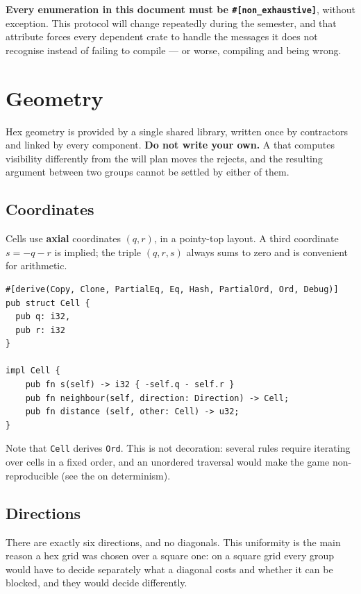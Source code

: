 \documentclass{article}
\begin{document}
\textbf{Every enumeration in this document must be \texttt{\#[non\_exhaustive]}}, without
exception. This protocol will change repeatedly during
the semester, and that attribute forces every dependent crate to handle the messages it does not
recognise instead of failing to compile --- or worse, compiling and being wrong.

\newpage
\section{Geometry}
\label{proto:geometry}

Hex geometry is provided by a single shared library, written once by contractors and linked by
every component. \textbf{Do not write your own.} A \ship{} that computes visibility differently
from the \chart{} will plan moves the \chart{} rejects, and the resulting argument between two
groups cannot be settled by either of them.

\subsection{Coordinates}
\label{proto:coords}

Cells use \textbf{axial} coordinates $(q, r)$, in a pointy-top layout. A third coordinate
$s = -q - r$ is implied; the triple $(q, r, s)$ always sums to zero and is convenient for
arithmetic.

\begin{lstlisting}
#[derive(Copy, Clone, PartialEq, Eq, Hash, PartialOrd, Ord, Debug)]
pub struct Cell {
  pub q: i32,
  pub r: i32
}

impl Cell {
    pub fn s(self) -> i32 { -self.q - self.r }
    pub fn neighbour(self, direction: Direction) -> Cell;
    pub fn distance (self, other: Cell) -> u32;
}
\end{lstlisting}

Note that \texttt{Cell} derives \texttt{Ord}. This is not decoration: several rules require
iterating over cells in a fixed order, and an unordered traversal would make the game
non-reproducible (see the \MD{} on determinism).

\subsection{Directions}
\label{proto:directions}

There are exactly six directions, and no diagonals. This uniformity is the main reason a hex grid
was chosen over a square one: on a square grid every group would have to decide separately what a
diagonal costs and whether it can be blocked, and they would decide differently.
\end{document}
